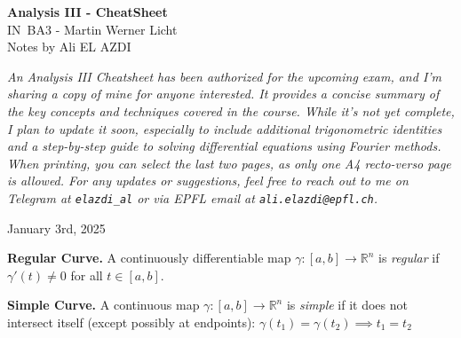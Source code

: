 \documentclass[8pt]{article}
\begin{document}
\begin{titlepage}
    \centering
    \vspace*{1cm}
    {\Huge \textbf{Analysis III - CheatSheet}} \\
    \vspace{10px}
    {\LARGE IN~BA3 - Martin Werner Licht} \\
    \vspace*{1cm}
    {\Large Notes by Ali EL AZDI} \\
    \vfill

    \begin{justify}
        \textit{An Analysis III Cheatsheet has been authorized for the upcoming exam, and I’m sharing a copy of mine for anyone interested. It provides a concise summary of the key concepts and techniques covered in the course. While it’s not yet complete, I plan to update it soon, especially to include additional trigonometric identities and a step-by-step guide to solving differential equations using Fourier methods. When printing, you can select the last two pages, as only one A4 recto-verso page is allowed. For any updates or suggestions, feel free to reach out to me on Telegram at \texttt{elazdi\_al} or via EPFL email at \texttt{ali.elazdi@epfl.ch}.}
    \end{justify}
    \vspace*{100px}

    {\large January 3rd, 2025}
    \vspace*{20px}
\end{titlepage}


\vspace*{-10px}
\noindent\textbf{Regular Curve.}
A continuously differentiable map
$\gamma : [a,b] \to \mathbb{R}^n$
is \emph{regular} if $\gamma'(t) \neq 0$ for all $t \in [a,b]$.

\smallskip
\noindent\textbf{Simple Curve.}
A continuous map
$\gamma : [a,b] \to \mathbb{R}^n$
is \emph{simple} if it does not intersect itself (except possibly at endpoints):
$\gamma(t_1) = \gamma(t_2) \implies t_1 = t_2$
\end{document}
